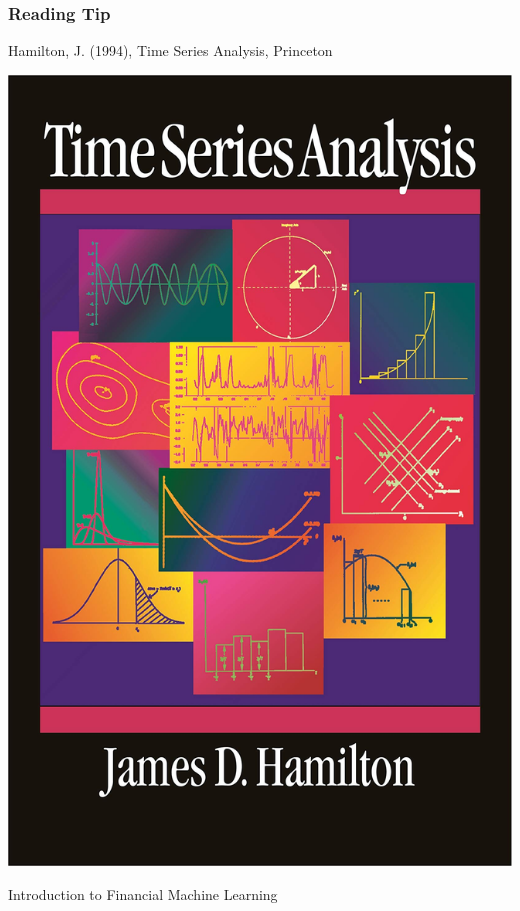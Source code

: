 \documentclass[xcolor=dvipsnames, english, 8pt]{beamer}
\begin{document}
\begin{frame}
    \frametitle{Reading Tip}
Hamilton, J. (1994), Time Series Analysis, Princeton\vspace{0.35cm}\\
\begin{center}

    \includegraphics[scale=0.075]{Hamilton}
\end{center}
\end{frame}





\begin{frame}[label=ML]
    \begin{center}
        {\color{ubRed} \Huge{Introduction to Financial Machine Learning}}
    \end{center}
\end{frame}
\end{document}
